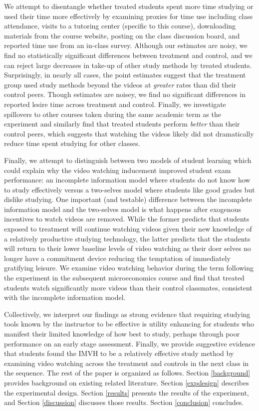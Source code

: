 \documentclass[12pt]{article}
\begin{document}
We attempt to disentangle whether treated students spent more time studying or used their time more effectively by examining proxies for time use including class attendance, visits to a tutoring center (specific to this course), downloading materials from the course website, posting on the class discussion board, and reported time use from an in-class survey. Although our estimates are noisy, we find no statistically significant differences between treatment and control, and we can reject large decreases in take-up of other study methods by treated students. Surprisingly, in nearly all cases, the point estimates suggest that the treatment group used study methods beyond the videos at \textit{greater} rates than did their control peers. Though estimates are noisey, we find no significant differences in reported lesire time across treatment and control.  Finally, we investigate spillovers to other courses taken during the same academic term as the experiment and similarly find that treated students perform \textit{better} than their control peers, which suggests that watching the videos likely did not dramatically reduce time spent studying for other classes.  

Finally, we attempt to distinguish between two models of student learning which could explain why the video watching inducement improved student exam performance:  an incomplete information model where students do not know how to study effectively versus a two-selves model where students like good grades but dislike studying.  One important (and testable) difference between the incomplete information model and the two-selves model is what happens after exogenous incentives to watch videos are removed. While the former predicts that students exposed to treatment will continue watching videos given their new knowledge of a relatively productive studying technology, the latter predicts that the students will return to their lower baseline levels of video watching as their doer selves no longer have a commitment device reducing the temptation of immediately gratifying leisure. We examine video watching behavior during the term following the experiment in the subsequent microeconomics course and find that treated students watch significantly more videos than their control classmates, consistent with the incomplete information model. 

Collectively, we interpret our findings as strong evidence that requiring studying tools known by the instructor to be effective is utility enhancing for students who manifest their limited knowledge of how best to study, perhaps through poor performance on an early stage assessment.  Finally, we provide suggestive evidence that students found the IMVH to be a relatively effective study method by examining video watching across the treatment and controls in the next class in the sequence.  The rest of the paper is organized as follows. Section \ref{background} provides background on existing related literature. Section \ref{expdesign} describes the experimental design. Section \ref{results} presents the results of the experiment, and Section \ref{discussion} discusses those results. Section \ref{conclusion} concludes.
\end{document}
